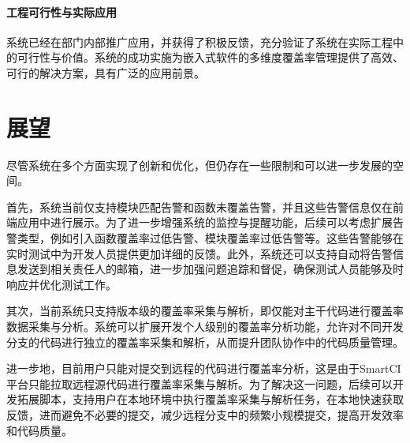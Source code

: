 \paragraph{\textbf{工程可行性与实际应用}}
系统已经在部门内部推广应用，并获得了积极反馈，充分验证了系统在实际工程中的可行性与价值。系统的成功实施为嵌入式软件的多维度覆盖率管理提供了高效、可行的解决方案，具有广泛的应用前景。

\section{展望}

尽管系统在多个方面实现了创新和优化，但仍存在一些限制和可以进一步发展的空间。

首先，系统当前仅支持模块匹配告警和函数未覆盖告警，并且这些告警信息仅在前端应用中进行展示。为了进一步增强系统的监控与提醒功能，后续可以考虑扩展告警类型，例如引入函数覆盖率过低告警、模块覆盖率过低告警等。这些告警能够在实时测试中为开发人员提供更加详细的反馈。此外，系统还可以支持自动将告警信息发送到相关责任人的邮箱，进一步加强问题追踪和督促，确保测试人员能够及时响应并优化测试工作。

其次，当前系统只支持版本级的覆盖率采集与解析，即仅能对主干代码进行覆盖率数据采集与分析。系统可以扩展开发个人级别的覆盖率分析功能，允许对不同开发分支的代码进行独立的覆盖率采集和解析，从而提升团队协作中的代码质量管理。

进一步地，目前用户只能对提交到远程的代码进行覆盖率分析，这是由于SmartCI平台只能拉取远程源代码进行覆盖率采集与解析。为了解决这一问题，后续可以开发拓展脚本，支持用户在本地环境中执行覆盖率采集与解析任务，在本地快速获取反馈，进而避免不必要的提交，减少远程分支中的频繁小规模提交，提高开发效率和代码质量。